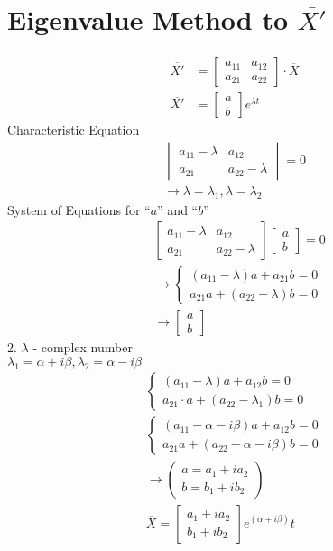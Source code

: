 \documentclass[10pt, letterpaper]{article}
\begin{document}
\section{Eigenvalue Method to $\overline{X'}$}
\begin{align*}
\overline{X'} &= \begin{bmatrix}
	a_{11} & a_{12}\\
	a_{21} & a_{22}
\end{bmatrix} \cdot \overline{X}\\
\overline{X'} &= \begin{bmatrix}
	a\\
	b
\end{bmatrix} e^{\lambda t}
\end{align*}
Characteristic Equation
\begin{align*}
\begin{vmatrix}
	a_{11}-\lambda & a_{12}\\
	a_{21} & a_{22}-\lambda
\end{vmatrix} =0\\
\rightarrow \lambda=\lambda_1, \lambda=\lambda_2
\end{align*}
System of Equations for ``$a$'' and ``$b$''
\begin{align*}
&\begin{bmatrix}
	a_{11}-\lambda & a_{12}\\
	a_{21} & a_{22}-\lambda
\end{bmatrix} \begin{bmatrix}
	a\\
	b
\end{bmatrix} = 0\\
&\rightarrow \begin{cases}
	(a_{11}-\lambda)a+a_{21}b=0\\
	a_{21}a+(a_{22}-\lambda)b=0
\end{cases}\\
&\rightarrow \begin{bmatrix}
	a\\
	b
\end{bmatrix}
\end{align*}
2. $\lambda$ - complex number\\
$\lambda_1=\alpha+i\beta, \lambda_2=\alpha-i\beta$
\begin{align*}
\begin{cases}
	(a_{11}-\lambda)a+a_{12}b=0\\
	a_{21} \cdot a+(a_{22}-\lambda_1)b=0
\end{cases}\\
\begin{cases}
	(a_{11}-\alpha-i\beta)a+a_{12}b=0\\
	a_{21}a+(a_{22}-\alpha-i\beta)b=0
\end{cases}\\
\rightarrow \begin{pmatrix}
	a=a_1+ia_2\\
	b=b_1+ib_2
\end{pmatrix}\\
\overline{X} = \begin{bmatrix}
	a_1+ia_2\\
	b_1+ib_2
\end{bmatrix} e^{(\alpha+i\beta)}t
\end{align*}
\end{document}
